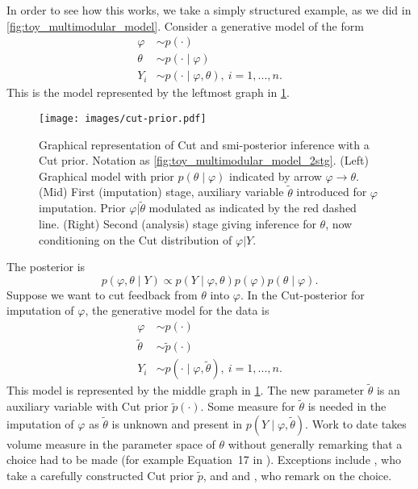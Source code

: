 In order to see how this works, we take a simply structured example, as we did in \cref{fig:toy_multimodular_model}.
Consider a generative model of the form
\begin{align*}
  \varphi & \sim p(\cdot)                                  \\
  \theta  & \sim p(\cdot \mid \varphi)                     \\
  Y_i     & \sim p(\cdot \mid \varphi,\theta),\ i=1,...,n.
\end{align*}
This is the model represented by the leftmost graph in \cref{fig:cut-prior}.
\begin{figure}
  \centering
  \texttt{[image: images/cut-prior.pdf]}
  \caption{Graphical representation of Cut and \acrshort*{smi}-posterior inference with a Cut prior. Notation as \protect\cref{fig:toy_multimodular_model_2stg}. (Left) Graphical model with prior $p(\theta \mid \varphi)$ indicated by arrow $\varphi\to\theta$.  (Mid) First (imputation) stage, auxiliary variable $\tilde\theta$ introduced for $\varphi$ imputation. Prior $\varphi|\tilde\theta$ modulated as indicated by the red dashed line. (Right) Second (analysis) stage giving inference for $\theta$, now conditioning on the Cut distribution of $\varphi|Y$.}
  \label{fig:cut-prior}
\end{figure}
The posterior is
\begin{equation}\label{eq:bayes_in_cut_prior}
  p(\varphi,\theta \mid Y)\propto p(Y \mid \varphi,\theta)p(\varphi)p(\theta \mid \varphi).
\end{equation}
Suppose we want to cut feedback from $\theta$ into $\varphi$.
In the Cut-posterior for imputation of $\varphi$, the generative model for the data is
\begin{align*}
  \varphi      & \sim p(\cdot)                                         \\
  \tilde\theta & \sim \tilde p(\cdot)                                  \\
  Y_i          & \sim p(\cdot \mid \varphi,\tilde \theta),\ i=1,...,n.
\end{align*}
This model is represented by the middle graph in \cref{fig:cut-prior}.
The new parameter $\tilde\theta$ is an auxiliary variable with Cut prior $\tilde p(\cdot)$.
Some measure for $\tilde\theta$ is needed in the imputation of $\varphi$ as $\tilde\theta$ is unknown and present in $p(Y \mid \varphi,\tilde \theta)$.
Work to date takes volume measure in the parameter space of $\theta$ without generally remarking that a choice had to be made (for example Equation~17 in \cite{Jacob2017together}). Exceptions include \cite{Moss2022}, who take a carefully constructed Cut prior $\tilde p$, and \cite{Styring2017extensification} and \cite{Yu2021variationalcut}, who remark on the choice.
